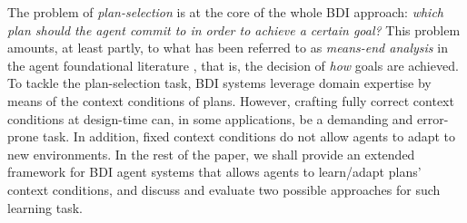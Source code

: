 The problem of \textit{plan-selection} is at the core of the
whole BDI approach: \emph{which plan should the agent commit to in order to achieve a certain
goal?}
%
This problem amounts, at least partly, to what has been referred to as \emph{means-end analysis} in the
agent foundational literature \cite{Pollack92-IRMA,Bratman88}, that is, the decision of \textit{how}
goals are achieved.
%
To tackle the plan-selection task, BDI systems leverage domain
expertise by means of the 
context conditions of plans. However, crafting fully correct context conditions at design-time can,
in some applications, be a demanding and error-prone task. In addition, fixed context conditions do
not allow agents to adapt to new environments. 
%
%
In the rest of the paper, we shall provide an extended framework for BDI agent systems that allows
agents to learn/adapt plans' context conditions, and discuss and evaluate two possible approaches
for such learning task.







% 
% 


